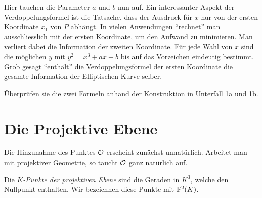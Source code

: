 Hier tauchen die Parameter $a$ und $b$ nun auf. Ein interessanter
Aspekt der Verdoppelungsformel ist die Tatsache, dass der Ausdruck für
$x$ nur von der ersten Koordinate $x_1$ von $P$ abhängt. In vielen
Anwendungen ``rechnet'' man ausschliesslich mit der ersten Koordinate,
um den Aufwand zu minimieren. Man verliert dabei die Information der
zweiten Koordinate. Für jede Wahl von $x$ sind die möglichen $y$ mit 
$y^2 = x^3+ax+b$ bis auf das Vorzeichen eindeutig bestimmt. Grob
gesagt ``enthält'' die Verdoppelungsformel der ersten Koordinate die
gesamte Information der Elliptischen Kurve selber.

\begin{aufgabe}
  Überprüfen sie die zwei Formeln anhand der Konstruktion in Unterfall
  1a und 1b. 
\end{aufgabe}


\section{Die Projektive Ebene}
\label{sec:projektiv}

Die Hinzunahme des Punktes ${\mathcal O}$ erscheint zunächst unnatürlich.
Arbeitet man mit projektiver Geometrie, so taucht ${\mathcal O}$ ganz natürlich
auf.

\begin{definition}
  Die \emph{$K$-Punkte der projektiven Ebene} sind die Geraden in $K^3$,
  welche den Nullpunkt enthalten. Wir bezeichnen diese Punkte mit
  ${\mathbb{P}}^2(K)$. 
\end{definition}

